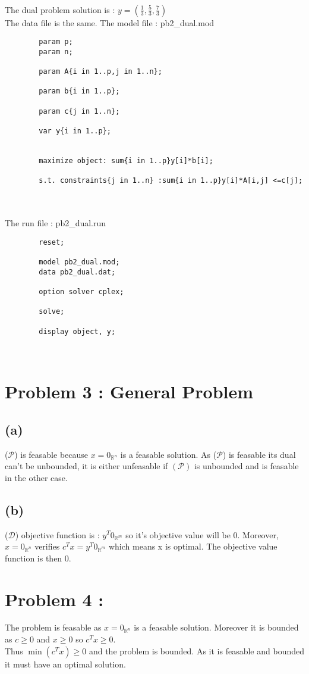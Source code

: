\documentclass{article}
\newenvironment{DDbox}[1]{
\begin{lrbox}{\BBbox}
    \begin{minipage}{\linewidth}}
{\end{minipage}
\end{lrbox}\noindent\colorbox{Zgris}{\usebox{\BBbox}} \\
[.5cm]}
\begin{document}
\\
The dual problem solution is : $y = (\frac{1}{3},\frac{5}{3}, \frac{7}{3})$ 
\\
The data file is the same.
The model file : pb2\_dual.mod 
\\
\begin{DDbox}{\linewidth}
    \begin{verbatim}
        param p;
        param n;
        
        param A{i in 1..p,j in 1..n};
        
        param b{i in 1..p};
        
        param c{j in 1..n};
        
        var y{i in 1..p};
        
        
        maximize object: sum{i in 1..p}y[i]*b[i];
        
        s.t. constraints{j in 1..n} :sum{i in 1..p}y[i]*A[i,j] <=c[j];
    \end{verbatim}
\end{DDbox}
\\
\newpage
The run file : pb2\_dual.run
\\
\begin{DDbox}{\linewidth}
    \begin{verbatim}
        reset;

        model pb2_dual.mod;
        data pb2_dual.dat;
        
        option solver cplex;
        
        solve;
        
        display object, y;
    \end{verbatim}
\end{DDbox}
\section*{Problem 3 : General Problem}
\subsection*{(a)}
($\mathcal{P}$) is feasable because $x =0_{\mathbb{R}^n}$ is a feasable solution.
 As ($\mathcal{P}$) is feasable its dual can't be unbounded, it is either unfeasable if $(\mathcal{P})$ is unbounded and is feasable in the other case.
\subsection*{(b)}
($\mathcal{D}$) objective function is : $y^T0_{\mathbb{R}^m}$ so it's objective value will be 0.
 Moreover, $x=0_{\mathbb{R}^n}$ verifies $c^Tx=y^T0_{\mathbb{R}^m}$ which means x is optimal.
 The objective value function is then 0.
\section*{Problem 4 :}
The problem is feasable as $x=0_{\mathbb{R}^n}$ is a feasable solution. Moreover it is bounded as $c \ge 0$ and $x \ge 0$ so $c^Tx \ge 0$.\\
 Thus $ \min(c^Tx)\ge 0$ and the problem is bounded. As it is feasable and bounded it must have an optimal solution.
\end{document}

